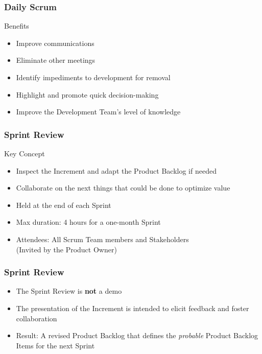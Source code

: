 \begin{frame}
	\frametitle{Daily Scrum}
	\begin{exampleblock}{Benefits}
		\begin{itemize}
			\item Improve communications
			\item Eliminate other meetings
			\item Identify impediments to development for removal
			\item Highlight and promote quick decision-making
			\item Improve the Development Team's level of knowledge
		\end{itemize}
	\end{exampleblock}
\end{frame}

\begin{frame}
	\frametitle{Sprint Review}
	\begin{block}{Key Concept}
		\begin{itemize}
			\item Inspect the Increment and adapt the Product Backlog if needed
			\item Collaborate on the next things that could be done to optimize value
		\end{itemize}
	\end{block}
	\vspace{0.5em}
	\begin{itemize}
		\setlength\itemsep{0.7em}
		\item Held at the end of each Sprint
		\item Max duration: 4 hours for a one-month Sprint
		\item Attendees: All Scrum Team members and Stakeholders\\
		(Invited by the Product Owner)
	\end{itemize}
\end{frame}

\begin{frame}
	\frametitle{Sprint Review}
	\begin{itemize}
		\setlength\itemsep{0.7em}
		\item The Sprint Review is \textbf{not} a demo
		\item The presentation of the Increment is intended to elicit feedback and foster collaboration
		\item Result: A revised Product Backlog that defines the \textit{probable} Product Backlog Items for the next Sprint
	\end{itemize}
\end{frame}

